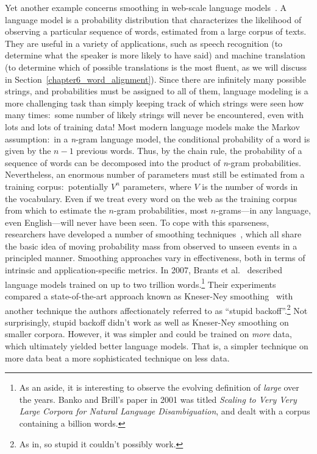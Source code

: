 Yet another example concerns smoothing in web-scale language
models~\cite{Brants_etal_EMNLP2007}.  A language model is a
probability distribution that characterizes the likelihood of
observing a particular sequence of words, estimated from a large
corpus of texts.  They are useful in a variety of applications, such
as speech recognition (to determine what the speaker is more likely to
have said) and machine translation (to determine which of possible
translations is the most fluent, as we will discuss in
Section~\ref{chapter6_word_alignment}).  Since there are infinitely
many possible strings, and probabilities must be assigned to all of
them, language modeling is a more challenging task than simply keeping
track of which strings were seen how many times:\ some number of
likely strings will never be encountered, even with lots and lots of
training data!  Most modern language models make the Markov
assumption:\ in a {\it n}-gram language model, the conditional
probability of a word is given by the $n-1$ previous words.  Thus, by
the chain rule, the probability of a sequence of words can be
decomposed into the product of {\it n}-gram probabilities.
Nevertheless, an enormous number of parameters must still be estimated
from a training corpus:\ potentially $V^n$ parameters, where $V$ is
the number of words in the vocabulary.  Even if we treat every word on
the web as the training corpus from which to estimate the $n$-gram
probabilities, most $n$-grams---in any language, even English---will
never have been seen.  To cope with this sparseness, researchers have
developed a number of smoothing
techniques~\cite{Chen_Goodman_ACL1996,Manning_Schutze_1999,Jurafsky_Martin_2009},
which all share the basic idea of moving probability mass from
observed to unseen events in a principled manner.  Smoothing
approaches vary in effectiveness, both in terms of intrinsic and
application-specific metrics.  In 2007, Brants et
al.~\cite{Brants_etal_EMNLP2007} described language models trained on
up to two trillion words.\footnote{As an aside, it is interesting to
  observe the evolving definition of {\it large} over the years.
  Banko and Brill's paper in 2001 was titled {\it Scaling to Very Very
    Large Corpora for Natural Language Disambiguation}, and dealt with
  a corpus containing a billion words.}  Their experiments compared a
state-of-the-art approach known as Kneser-Ney
smoothing~\cite{Chen_Goodman_ACL1996} with another technique the
authors affectionately referred to as ``stupid backoff''.\footnote{As
  in, so stupid it couldn't possibly work.}  Not surprisingly, stupid
backoff didn't work as well as Kneser-Ney smoothing on smaller
corpora.  However, it was simpler and could be trained on {\it more}
data, which ultimately yielded better language models.  That is, a
simpler technique on more data beat a more sophisticated technique on
less data.

